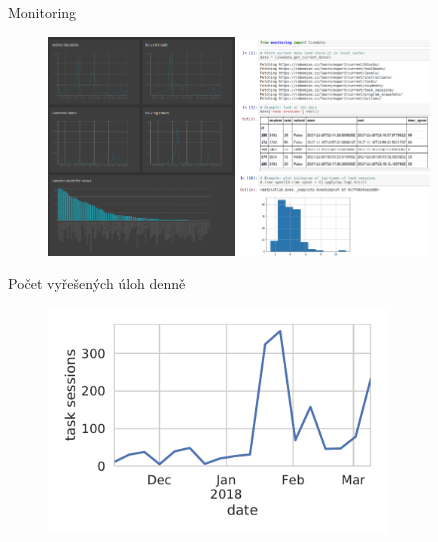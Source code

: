 \documentclass[
]{beamer}
\begin{document}
\begin{frame}{Monitoring}
\begin{figure}
\includegraphics[width=0.44\textwidth]{../img/monitoring-dashboard}
\includegraphics[width=0.45\textwidth]{../img/investigation-notebook}
\end{figure}
\end{frame}

\begin{frame}{Počet vyřešených úloh denně}
\begin{figure}
\includegraphics[width=0.8\textwidth]{../img/daily-task-sessions}
\end{figure}
\end{frame}
\end{document}
